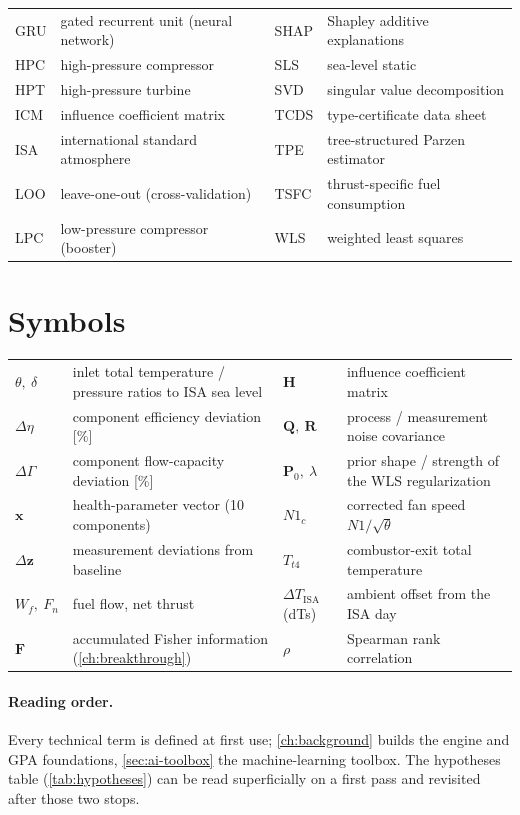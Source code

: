\begin{center}
\begin{tabular}{@{}p{}p{}p{}p{}@{}}
  GRU & gated recurrent unit (neural network) & SHAP & Shapley additive explanations \\
  HPC & high-pressure compressor & SLS & sea-level static \\
  HPT & high-pressure turbine & SVD & singular value decomposition \\
  ICM & influence coefficient matrix & TCDS & type-certificate data sheet \\
  ISA & international standard atmosphere & TPE & tree-structured Parzen estimator \\
  LOO & leave-one-out (cross-validation) & TSFC & thrust-specific fuel consumption \\
  LPC & low-pressure compressor (booster) & WLS & weighted least squares \\
  \bottomrule
\end{tabular}
\end{center}

\section*{Symbols}

\begin{center}\footnotesize
\setlength{\tabcolsep}{4pt}
\begin{tabular}{@{}p{}p{}p{}p{}@{}}
  \toprule
  $\theta,\ \delta$ & inlet total temperature / pressure ratios to ISA sea level &
    $\mathbf{H}$ & influence coefficient matrix \\
  $\Delta\eta$ & component efficiency deviation [\%] &
    $\mathbf{Q},\ \mathbf{R}$ & process / measurement noise covariance \\
  $\Delta\Gamma$ & component flow-capacity deviation [\%] &
    $\mathbf{P}_0,\ \lambda$ & prior shape / strength of the WLS regularization \\
  $\mathbf{x}$ & health-parameter vector (10 components) &
    $N1_c$ & corrected fan speed $N1/\sqrt{\theta}$ \\
  $\Delta\mathbf{z}$ & measurement deviations from baseline &
    $T_{t4}$ & combustor-exit total temperature \\
  $W_f,\ F_n$ & fuel flow, net thrust &
    $\Delta T_{\mathrm{ISA}}$ (dTs) & ambient offset from the ISA day \\
  $\mathbf{F}$ & accumulated Fisher information (\cref{ch:breakthrough}) &
    $\rho$ & Spearman rank correlation \\
  \bottomrule
\end{tabular}
\end{center}

\paragraph{Reading order.} Every technical term is defined at first use;
\cref{ch:background} builds the engine and GPA foundations,
\cref{sec:ai-toolbox} the machine-learning toolbox. The hypotheses table
(\cref{tab:hypotheses}) can be read superficially on a first pass and revisited
after those two stops.
